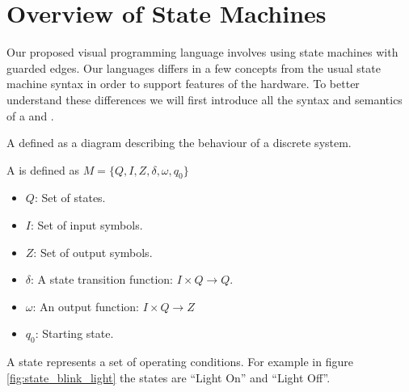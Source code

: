 \section{Overview of State Machines} \label{sec:overviewstatechart}

Our proposed visual programming language involves using state machines with guarded edges. Our languages differs in a few concepts from the usual state machine syntax in order to support features of the hardware. To better understand these differences we will first introduce all the syntax and semantics of a \cite{booth} and \cite{UML2}.

A \cite{booth} defined as a diagram describing the behaviour of a discrete system.

\begin{definition}
A  is defined as $M = \lbrace Q, I, Z, \delta, \omega, q_0\rbrace$

\label{def:statecharts}
\begin{itemize}
	\item $Q$: Set of states.
	\item $I$: Set of input symbols.
	\item $Z$: Set of output symbols.
	\item $\delta$: A state transition function: $I \times Q \rightarrow Q$. 
	\item $\omega$: An output function: $I \times Q \rightarrow Z$
	\item $q_0$: Starting state.
\end{itemize}
\end{definition}

A state represents a set of operating conditions. For example in figure \ref{fig:state_blink_light} the states are ``Light On'' and ``Light Off''.

